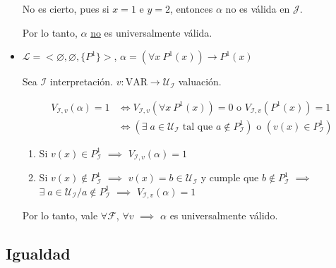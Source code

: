 \begin{itemize}
        No es cierto, pues si $x = 1$ e $y = 2$, entonces $\alpha$ no es
        válida en $\mathcal{J}$.

        Por lo tanto, $\alpha$ \underline{no} es universalmente válida.

    \item $\mathcal{L} = <\varnothing, \varnothing, \{ P^1 \}>$,
        $\alpha = (\forall x ~ P^1(x)) \to P^1(x)$

        Sea $\mathcal{I}$ interpretación. 
        $v: \mathrm{VAR} \to \mathcal{U}_{\mathcal{I}}$ valuación.

        \begin{align*}
            V_{\mathcal{I}, v}(\alpha) = 1 &\iff
            V_{\mathcal{I}, v}(\forall x ~ P^1(x)) = 0 
            \text{ o }
            V_{\mathcal{I}, v}(P^1(x)) = 1 \\
            &\iff \left(\exists \; a \in \mathcal{U}_{\mathcal{I}} 
                \text{ tal que } a \notin P^1_{\mathcal{I}}\right)
            \text{ o }
            \left(v(x) \in P^1_{\mathcal{I}}\right)
        \end{align*}

        \begin{enumerate}[%
                        labelindent=*,
                        style=multiline,
                        leftmargin=*,
                        align=left,
                        leftmargin=2\parindent,
                        label=Caso \arabic*)]
            \item Si $v(x) \in P^1_{\mathcal{I}}$
                $\implies$
                $V_{\mathcal{I}, v}(\alpha) = 1$
            \item Si $v(x) \notin P^1_{\mathcal{I}}$
                $\implies$
                $v(x) = b \in \mathcal{U}_{\mathcal{I}}$ y cumple que
                $b \notin P^1_{\mathcal{I}}$
                $\implies$
                $\exists \; a \in \mathcal{U}_{\mathcal{I}} / 
                a \notin P^1_{\mathcal{I}}$
                $\implies$
                $V_{\mathcal{I}, v}(\alpha) = 1$
        \end{enumerate}
        
        Por lo tanto, vale $\forall \mathcal{F}$, $\forall v$
        $\implies$
        $\alpha$ es universalmente válido.
\end{itemize}

\subsection{Igualdad}


